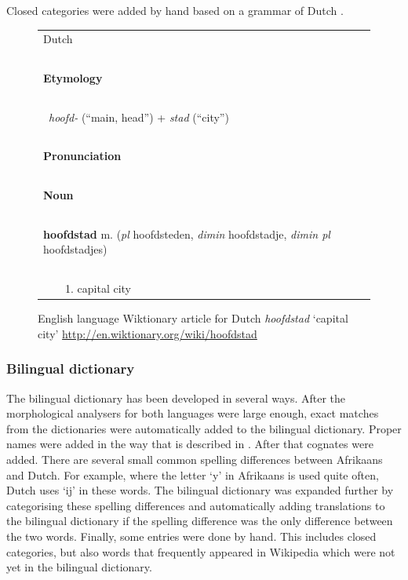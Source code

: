 \documentclass[11pt]{article}
\begin{document}
Closed categories were added by hand based on a grammar of Dutch \cite{Shetter:02}.

\begin{figure}
\centering
\begin{tiny}
\begin{tabular}{|l|}
\hline
{\large Dutch} \\
~\\
{\bf Etymology}\\
~\\
~{\em hoofd-} (``main, head'') + {\em stad} (``city'')\\
~\\
{\bf Pronunciation}\\
~\\
{\bf Noun}\\
~\\
{\bf hoofdstad} m. ({\em pl} hoofdsteden, {\em dimin} hoofdstadje, {\em dimin pl} hoofdstadjes) \\
~\\
~~~~1. capital city \\

\hline
\end{tabular}
\end{tiny}
\caption{English language Wiktionary article for Dutch \emph{hoofdstad} `capital city' 
    {\small \url{http://en.wiktionary.org/wiki/hoofdstad}}}
\label{fig:wikt1}
\end{figure}

\subsubsection{Bilingual dictionary}

The bilingual dictionary has been developed in several ways. After the morphological 
analysers for both languages were large enough, exact matches from the dictionaries
were automatically added to the bilingual dictionary. Proper names were added in the
way that is described in . After that cognates were added. There are several
small common spelling differences between Afrikaans and Dutch. For example,
where the letter `y' in Afrikaans is used quite often, Dutch uses `ij' in these words.
The bilingual dictionary was expanded further by categorising these spelling differences and
automatically adding translations to the bilingual dictionary if the spelling difference was the
only difference between the two words. Finally, some entries were done by hand.
This includes closed categories, but also words that frequently appeared in Wikipedia
which were not yet in the bilingual dictionary.
\end{document}

